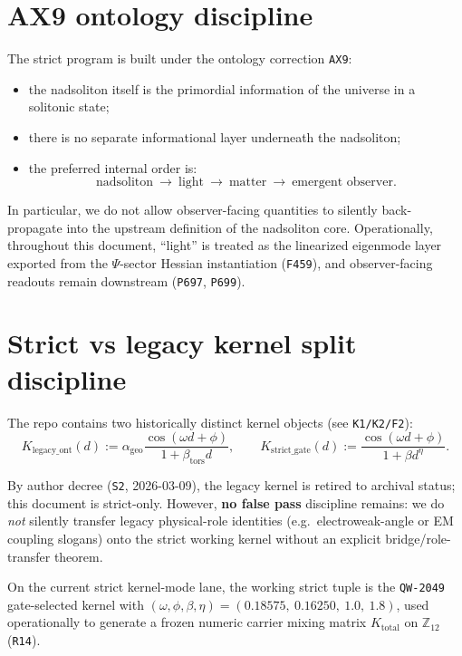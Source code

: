 \documentclass[11pt,a4paper]{article}
\makeatletter
\newcommand{\chapter}{\@ifstar{\section*}{\section}}
\makeatother
\begin{document}
\chapter{Ontology and scope}
\section{AX9 ontology discipline}

The strict program is built under the ontology correction \texttt{AX9}:

\begin{itemize}
  \item the nadsoliton itself is the primordial information of the universe in a solitonic state;
  \item there is no separate informational layer underneath the nadsoliton;
  \item the preferred internal order is:
  \[
    \text{nadsoliton}\ \to\ \text{light}\ \to\ \text{matter}\ \to\ \text{emergent observer}.
  \]
\end{itemize}

In particular, we do not allow observer-facing quantities to silently back-propagate into the upstream definition of the nadsoliton core.
Operationally, throughout this document, “light” is treated as the linearized eigenmode layer exported from the $\Psi$-sector Hessian instantiation (\texttt{F459}),
and observer-facing readouts remain downstream (\texttt{P697}, \texttt{P699}).
\section{Strict vs legacy kernel split discipline}

The repo contains two historically distinct kernel objects (see \texttt{K1/K2/F2}):
\[
K_{\mathrm{legacy\_ont}}(d)
:=
\alpha_{\mathrm{geo}}\frac{\cos(\omega d+\phi)}{1+\beta_{\mathrm{tors}}d},
\qquad
K_{\mathrm{strict\_gate}}(d)
:=
\frac{\cos(\omega d+\phi)}{1+\beta d^{\eta}}.
\]

By author decree (\texttt{S2}, 2026-03-09), the legacy kernel is retired to archival status; this document is strict-only.
However, \textbf{no false pass} discipline remains:
we do \emph{not} silently transfer legacy physical-role identities (e.g.\ electroweak-angle or EM coupling slogans) onto the strict working kernel without an explicit bridge/role-transfer theorem.

On the current strict kernel-mode lane, the working strict tuple is the \texttt{QW-2049} gate-selected kernel with
$(\omega,\phi,\beta,\eta)=(0.18575,\ 0.16250,\ 1.0,\ 1.8)$, used operationally to generate a frozen numeric carrier mixing matrix $K_{\mathrm{total}}$ on $\mathbb{Z}_{12}$ (\texttt{R14}).
\end{document}
